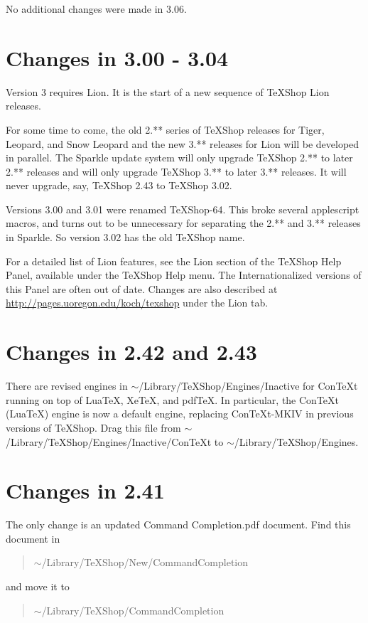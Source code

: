 \documentclass[11pt, oneside]{amsart}
\begin{document}
No additional changes were made in 3.06.

\section{Changes in 3.00 - 3.04}

Version 3 requires Lion. It is the start of a new sequence of TeXShop Lion releases. 

For some time to come, the old 2.** series of TeXShop releases for Tiger, Leopard, and Snow Leopard and the new 3.** releases for Lion
will be developed in parallel. The Sparkle update
system will only upgrade TeXShop 2.** to later 2.** releases and will only upgrade TeXShop 3.** to later 3.** releases. It will never upgrade, say, TeXShop 2.43 to
TeXShop 3.02.

Versions 3.00 and 3.01 were renamed TeXShop-64. This broke several applescript macros, and turns out to be unnecessary for separating the 2.** and 3.** releases in Sparkle. So version 3.02 has the old TeXShop name. 

For a detailed list of Lion features, see the Lion section of the TeXShop Help Panel, available under the TeXShop Help menu. The Internationalized versions of
this Panel are often out of date. Changes are also described at \url{http://pages.uoregon.edu/koch/texshop} under the Lion tab.

\section{Changes in 2.42 and 2.43}
There are revised engines in $\sim$/Library/TeXShop/Engines/Inactive for ConTeXt running on top of LuaTeX, XeTeX, and pdfTeX.
In particular, the ConTeXt (LuaTeX) engine is now a default engine, replacing ConTeXt-MKIV in previous versions of TeXShop. Drag this file
from $\sim$/Library/TeXShop/Engines/Inactive/ConTeXt to $\sim$/Library/TeXShop/Engines.



\section{Changes in 2.41}

The only change is an updated Command Completion.pdf document. Find this document in
\begin{quotation}
 $\sim$/Library/TeXShop/New/CommandCompletion
 \end{quotation}  and move it to  \begin{quotation}$\sim$/Library/TeXShop/CommandCompletion\end{quotation}
\end{document}
